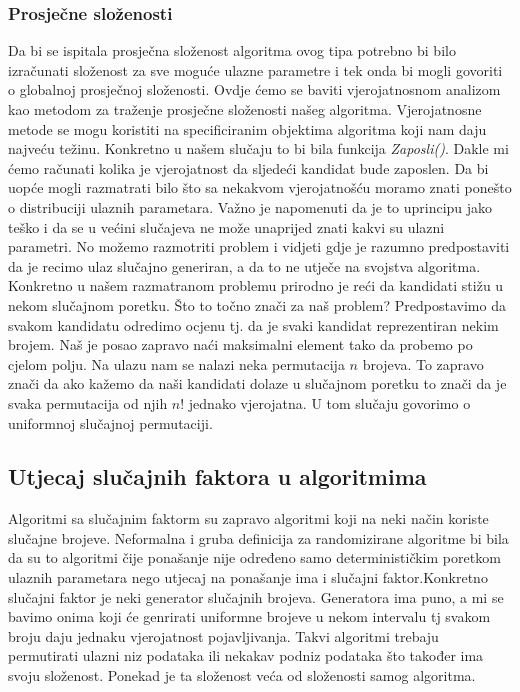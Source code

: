 \documentclass[10pt,a4paper]{article}
\begin{document}
\subsubsection*{Prosječne složenosti}
Da bi se ispitala prosječna složenost algoritma ovog tipa potrebno bi bilo izračunati složenost za sve 
moguće ulazne parametre i tek onda bi mogli govoriti o globalnoj prosječnoj složenosti. Ovdje ćemo se 
baviti vjerojatnosnom analizom kao metodom za traženje prosječne složenosti našeg algoritma. Vjerojatnosne 
metode se mogu koristiti na specificiranim objektima algoritma koji nam daju najveću težinu. Konkretno u našem 
slučaju to bi bila funkcija \textit{Zaposli()}. Dakle mi ćemo računati kolika je vjerojatnost da sljedeći kandidat 
bude zaposlen. Da bi uopće mogli razmatrati bilo što sa nekakvom vjerojatnošću moramo znati ponešto o distribuciji
ulaznih parametara. Važno je napomenuti da je to uprincipu jako teško i da se u većini slučajeva ne može unaprijed
znati kakvi su ulazni parametri. No možemo razmotriti problem i vidjeti gdje je razumno predpostaviti da je recimo
ulaz slučajno generiran, a da to ne utječe na svojstva algoritma. Konkretno u našem razmatranom problemu prirodno
je reći da kandidati stižu u nekom slučajnom poretku. Što to točno znači za naš problem?
Predpostavimo da svakom kandidatu odredimo ocjenu tj. da je svaki kandidat reprezentiran nekim brojem. Naš je posao 
zapravo naći maksimalni element tako da probemo po cjelom polju. Na ulazu nam se nalazi neka permutacija $n$ brojeva. 
To zapravo znači da ako kažemo da naši kandidati dolaze u slučajnom poretku to znači da je svaka permutacija od njih $n!$ 
jednako vjerojatna. U tom slučaju govorimo o uniformnoj slučajnoj permutaciji.

\subsection{Utjecaj slučajnih faktora u algoritmima}
Algoritmi sa slučajnim faktorm su zapravo algoritmi koji na neki način koriste slučajne brojeve. Neformalna i gruba definicija 
za randomizirane algoritme bi bila da su to algoritmi čije ponašanje nije određeno samo determinističkim poretkom ulaznih 
parametara nego utjecaj na ponašanje ima i slučajni faktor.Konkretno slučajni faktor je neki generator slučajnih brojeva. 
Generatora ima puno, a mi se bavimo onima koji će genrirati uniformne brojeve u nekom intervalu tj svakom broju daju jednaku 
vjerojatnost pojavljivanja. Takvi algoritmi trebaju permutirati ulazni niz podataka ili nekakav podniz podataka što također 
ima svoju složenost. Ponekad je ta složenost veća od složenosti samog algoritma.
\end{document}
